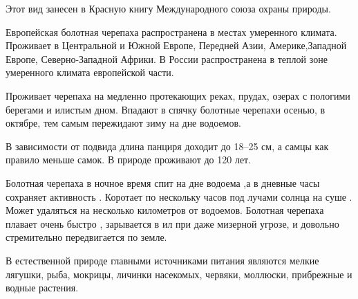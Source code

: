 

Этот вид занесен в Красную книгу Международного союза охраны природы.

Европейская болотная черепаха распространена в местах умеренного климата. Проживает в Центральной и Южной Европе, Передней Азии, Америке,Западной Европе, Северно-Западной Африки. В России распространена в теплой зоне умеренного климата европейской части.

Проживает черепаха на медленно протекающих реках, прудах, озерах с пологими берегами и илистым дном.
Впадают в спячку болотные черепахи осенью, в октябре, тем самым пережидают зиму на дне водоемов.

\begin{figure}[H]
\end{figure}

В зависимости от подвида длина панциря доходит до 18–25 см, а самцы как правило меньше самок. В природе проживают до 120 лет.

Болотная черепаха в ночное время спит на дне водоема ,а в дневные часы сохраняет активность . Коротает по нескольку часов под лучами солнца на суше . Может удаляться на несколько километров от водоемов. Болотная черепаха плавает очень быстро , зарывается в ил при даже мизерной угрозе, и довольно стремительно передвигается по земле. 


В естественной природе главными источниками питания являются мелкие лягушки, рыба, мокрицы, личинки насекомых, червяки, моллюски, прибрежные и водные растения.

\begin{figure}[H]
\end{figure}


